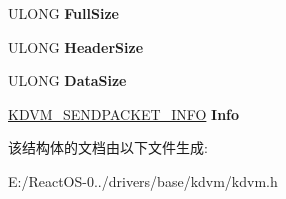 \begin{DoxyCompactItemize}
U\+L\+O\+NG {\bfseries Full\+Size}
\item 
\mbox{\label{struct_k_d_v_m___r_e_c_v___p_k_t___r_e_s_u_l_t_aca29f68e222611c505dfffd202ec9259}} 
U\+L\+O\+NG {\bfseries Header\+Size}
\item 
\mbox{\label{struct_k_d_v_m___r_e_c_v___p_k_t___r_e_s_u_l_t_a2fe0c7c0e1933f7a6fd3031cf67ded6b}} 
U\+L\+O\+NG {\bfseries Data\+Size}
\item 
\mbox{\label{struct_k_d_v_m___r_e_c_v___p_k_t___r_e_s_u_l_t_ad0b32c8902d603413cdc2f02ac7d7be9}} 
\hyperlink{struct_k_d_v_m___s_e_n_d_p_a_c_k_e_t___i_n_f_o}{K\+D\+V\+M\+\_\+\+S\+E\+N\+D\+P\+A\+C\+K\+E\+T\+\_\+\+I\+N\+FO} {\bfseries Info}
\end{DoxyCompactItemize}


该结构体的文档由以下文件生成\+:\begin{DoxyCompactItemize}
\item 
E\+:/\+React\+O\+S-\/0../drivers/base/kdvm/kdvm.\+h\end{DoxyCompactItemize}
